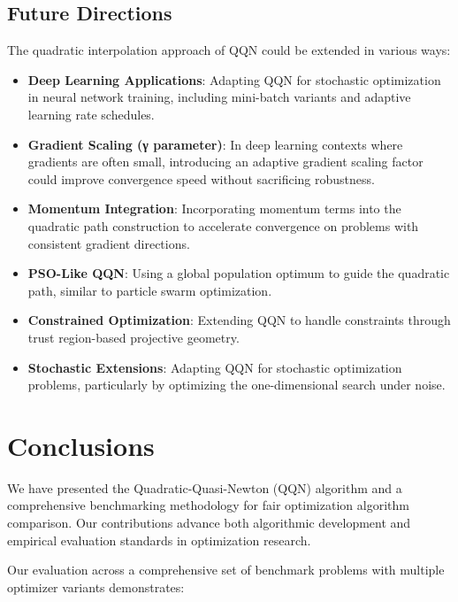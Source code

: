 \hypertarget{future-directions}{%
\subsection{Future Directions}\label{future-directions}}

The quadratic interpolation approach of QQN could be extended in various ways:

\begin{itemize}
\tightlist
\item
  \textbf{Deep Learning Applications}: Adapting QQN for stochastic optimization in neural network training, including mini-batch variants and adaptive learning rate schedules.
\item
  \textbf{Gradient Scaling (γ parameter)}: In deep learning contexts where gradients are often small, introducing an adaptive gradient scaling factor could improve convergence speed without sacrificing robustness.
\item
  \textbf{Momentum Integration}: Incorporating momentum terms into the quadratic path construction to accelerate convergence on problems with consistent gradient directions.
\item
  \textbf{PSO-Like QQN}: Using a global population optimum to guide the quadratic path, similar to particle swarm optimization.
\item
  \textbf{Constrained Optimization}: Extending QQN to handle constraints through trust region-based projective geometry.
\item
  \textbf{Stochastic Extensions}: Adapting QQN for stochastic optimization problems, particularly by optimizing the one-dimensional search under noise.
\end{itemize}

\hypertarget{conclusions}{%
\section{Conclusions}\label{conclusions}}

We have presented the Quadratic-Quasi-Newton (QQN) algorithm and a comprehensive benchmarking methodology for fair optimization algorithm comparison. Our contributions advance both algorithmic development and empirical evaluation standards in optimization research.

Our evaluation across a comprehensive set of benchmark problems with multiple optimizer variants demonstrates:

